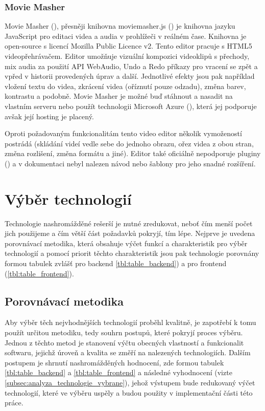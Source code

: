 \documentclass[thesis=M,czech]{FITthesis}[2012/06/26]
\begin{document}
\subsubsection{Movie Masher} \label{subsubsec:analyza_reseni_mm}
Movie Masher (\cite{mm}), přesněji knihovna moviemasher.js (\cite{mm_js}) je knihovna jazyku JavaScript pro editaci videa a audia v prohlížeči v reálném čase. Knihovna je open-source s licencí Mozilla Public Licence v2. Tento editor pracuje s HTML5 videopřehrávačem. Editor umožňuje vizuální kompozici videoklipů s přechody, mix audia za použití API WebAudio, Undo a Redo příkazy pro vracení se zpět a vpřed v historii provedených úprav a další. Jednotlivé efekty jsou pak například vložení textu do videa, zkrácení videa (oříznutí pouze odzadu), změna barev, kontrastu a podobně. Movie Masher je možné buď stáhnout a nasadit na vlastním serveru nebo použít technologii Microsoft Azure (\cite{mm_azure}), která jej podporuje avšak její hosting je placený.
	
	Oproti požadovaným funkcionalitám tento video editor několik vymožeností postrádá (skládání videí vedle sebe do jednoho obrazu, ořez videa z obou stran, změna rozlišení, změna formátu a jiné). Editor také oficiálně nepodporuje pluginy (\cite{mm_azure}) a v dokumentaci nebyl nalezen návod nebo šablony pro jeho snadné rozšíření. 



\section{Výběr technologií} \label{sec:analyza_technologie}
Technologie nashromážděné rešerší je nutné zredukovat, neboť čím menší počet jich použijeme a čím větší část požadavků pokryjí, tím lépe. Nejprve je uvedena porovnávací metodika, která obsahuje výčet funkcí a charakteristik pro výběr technologií a pomocí priorit těchto charakteristik jsou pak technologie porovnány formou tabulek zvlášť pro backend \ref{tbl:table_backend}) a pro frontend (\ref{tbl:table_frontend}).

\subsection{Porovnávací metodika} \label{subsec:analyza_technologie_metodika}
Aby výběr těch nejvhodnějších technologií proběhl kvalitně, je zapotřebí k tomu použít určitou metodiku, tedy souhrn postupů, které pokryjí proces výběru. Jednou z těchto metod je stanovení výčtu obecných vlastností a funkcionalit softwaru, jejichž úroveň a kvalita se změří na nalezených technologiích. Dalším postupem je shrnutí nashromážděných hodnocení, zde formou tabulek \ref{tbl:table_backend} a \ref{tbl:table_frontend} a následné vyhodnocení (vizte \ref{subsec:analyza_technologie_vybrane}), jehož výstupem bude redukovaný výčet technologií, které ve výběru uspěly a budou použity v implementační části této práce.
	
\end{document}
